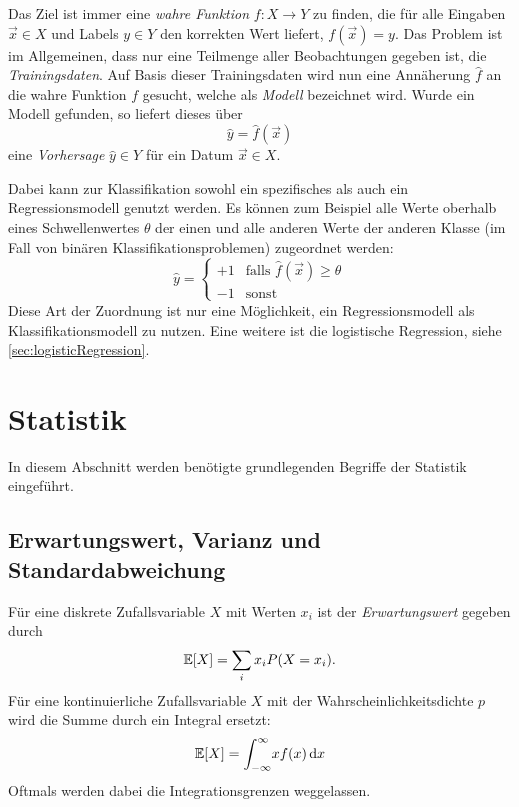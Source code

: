		Das Ziel ist immer eine \emph{wahre Funktion} \( f : X \to Y \) zu finden, die für alle Eingaben \( \vec{x} \in X \) und Labels \( y \in Y \) den korrekten Wert liefert, \dh \( f(\vec{x}) = y \). Das Problem ist im Allgemeinen, dass nur eine Teilmenge aller Beobachtungen gegeben ist, die \emph{Trainingsdaten}. Auf Basis dieser Trainingsdaten wird nun eine Annäherung \( \hat{f} \) an die wahre Funktion \(f\) gesucht, welche als \emph{Modell} bezeichnet wird. Wurde ein Modell gefunden, so liefert dieses über
		\begin{equation}
			\hat{y} = \hat{f}(\vec{x})
		\end{equation}
		eine \emph{Vorhersage} \( \hat{y} \in Y \) für ein Datum \( \vec{x} \in X \).

		Dabei kann zur Klassifikation sowohl ein spezifisches als auch ein Regressionsmodell genutzt werden. Es können zum Beispiel alle Werte oberhalb eines Schwellenwertes \(\theta\) der einen und alle anderen Werte der anderen Klasse (im Fall von binären Klassifikationsproblemen) zugeordnet werden:
		\begin{equation}
			\hat{y} =
				\begin{cases}
					+1 & \text{falls } \hat{f}(\vec{x}) \geq \theta \\
					-1 & \text{sonst}
				\end{cases}
		\end{equation}
		Diese Art der Zuordnung ist nur eine Möglichkeit, ein Regressionsmodell als Klassifikationsmodell zu nutzen. Eine weitere ist \zB die logistische Regression, siehe \autoref{sec:logisticRegression}.

	\section{Statistik}
		In diesem Abschnitt werden benötigte grundlegenden Begriffe der Statistik eingeführt.

		\subsection{Erwartungswert, Varianz und Standardabweichung}
			Für eine diskrete Zufallsvariable \(X\) mit Werten \( x_i \) ist der \emph{Erwartungswert} gegeben durch
			\begin{equation}
				\mathbb{E}[X] = \sum_i x_i P(X = x_i).
			\end{equation}
			Für eine kontinuierliche Zufallsvariable \(X\) mit der Wahrscheinlichkeitsdichte \(p\) wird die Summe durch ein Integral ersetzt:
			\begin{equation}
				\mathbb{E}[X] = \int_{-\infty}^{\infty} \! x f(x) \dd{x}
			\end{equation}
			Oftmals werden dabei die Integrationsgrenzen weggelassen.

